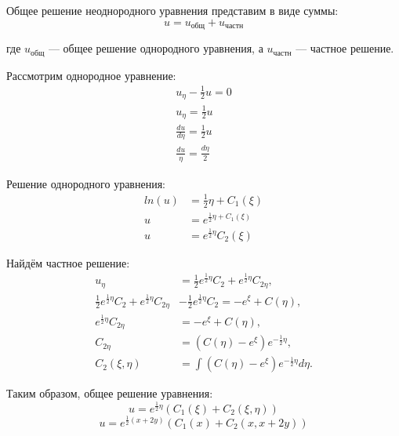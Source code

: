 \documentclass[a4paper,12pt]{article}
\begin{document}
Общее решение неоднородного уравнения представим в виде суммы:
\begin{equation*}
    u = u_{\text{общ}} + u_{\text{частн}}
\end{equation*}

где \( u_{\text{общ}} \) — общее решение однородного уравнения, а \( u_{\text{частн}} \) — частное решение.

Рассмотрим однородное уравнение:
\begin{align*}
     u_{\eta} - \frac{1}{2} u=0 \\
     u_{\eta} =\frac{1}{2} u\\
     \frac{du}{d\eta}=\frac{1}{2}u\\
     \frac{du}{\eta}=\frac{d\eta}{2}
\end{align*}

Решение однородного уравнения:
\begin{equation*}
    \begin{aligned}
     ln(u) &=\frac{1}{2}\eta +C_1(\xi) \\
     u&=e^{\frac{1}{2}\eta +C_1(\xi)} \\
     u&= e^{\frac{1}{2}\eta}C_2(\xi)
    \end{aligned}
\end{equation*}

Найдём частное решение:
\begin{equation*}
    \begin{aligned}
        u_{\eta} &= \frac{1}{2} e^{\frac{1}{2}\eta} C_2 + e^{\frac{1}{2}\eta} C_{2\eta}, \\
        \frac{1}{2} e^{\frac{1}{2}\eta} C_2 + e^{\frac{1}{2}\eta} C_{2\eta} 
        &- \frac{1}{2} e^{\frac{1}{2}\eta} C_2 = - e^{\xi} + C(\eta), \\
        e^{\frac{1}{2}\eta} C_{2\eta} &= - e^{\xi} + C(\eta), \\
        C_{2\eta} &= (C(\eta) - e^{\xi}) e^{-\frac{1}{2}\eta}, \\
        C_2(\xi, \eta) &= \int (C(\eta) - e^{\xi}) e^{-\frac{1}{2}\eta} d\eta.
    \end{aligned}
\end{equation*}

Таким образом, общее решение уравнения:
\begin{equation*}
    u = e^{\frac{1}{2}\eta} ( C_1(\xi) + C_2(\xi, \eta) )
\end{equation*}
\begin{equation*}
     u = e^{\frac{1}{2}(x+2y)} ( C_1(x) + C_2(x, x+2y) )
\end{equation*}
\end{document}
